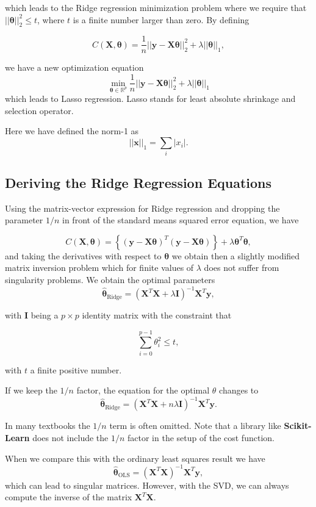 \documentclass[%
oneside,                 %
final,                   %
10pt]{article}
\begin{document}
which leads to the Ridge regression minimization problem where we
require that $\vert\vert \bm{\theta}\vert\vert_2^2\le t$, where $t$ is
a finite number larger than zero. By defining

\[
C(\bm{X},\bm{\theta})=\frac{1}{n}\vert\vert \bm{y}-\bm{X}\bm{\theta}\vert\vert_2^2+\lambda\vert\vert \bm{\theta}\vert\vert_1,
\]

we have a new optimization equation
\[
{\displaystyle \min_{\bm{\theta}\in
{\mathbb{R}}^{p}}}\frac{1}{n}\vert\vert \bm{y}-\bm{X}\bm{\theta}\vert\vert_2^2+\lambda\vert\vert \bm{\theta}\vert\vert_1
\]
which leads to Lasso regression. Lasso stands for least absolute shrinkage and selection operator. 

Here we have defined the norm-1 as 
\[
\vert\vert \bm{x}\vert\vert_1 = \sum_i \vert x_i\vert. 
\]

\subsection{Deriving the  Ridge Regression Equations}

Using the matrix-vector expression for Ridge regression and dropping the parameter $1/n$ in front of the standard means squared error equation, we have

\[
C(\bm{X},\bm{\theta})=\left\{(\bm{y}-\bm{X}\bm{\theta})^T(\bm{y}-\bm{X}\bm{\theta})\right\}+\lambda\bm{\theta}^T\bm{\theta},
\]
and 
taking the derivatives with respect to $\bm{\theta}$ we obtain then
a slightly modified matrix inversion problem which for finite values
of $\lambda$ does not suffer from singularity problems. We obtain
the optimal parameters
\[
\hat{\bm{\theta}}_{\mathrm{Ridge}} = \left(\bm{X}^T\bm{X}+\lambda\bm{I}\right)^{-1}\bm{X}^T\bm{y},
\]

with $\bm{I}$ being a $p\times p$ identity matrix with the constraint that

\[
\sum_{i=0}^{p-1} \theta_i^2 \leq t,
\]

with $t$ a finite positive number. 

If we keep the $1/n$ factor, the equation for the optimal $\theta$ changes to
\[
\hat{\bm{\theta}}_{\mathrm{Ridge}} = \left(\bm{X}^T\bm{X}+n\lambda\bm{I}\right)^{-1}\bm{X}^T\bm{y}.
\]

In many textbooks the $1/n$ term is often omitted. Note that a library like \textbf{Scikit-Learn} does not include the $1/n$ factor in the setup of the cost function.

When we compare this with the ordinary least squares result we have
\[
\hat{\bm{\theta}}_{\mathrm{OLS}} = \left(\bm{X}^T\bm{X}\right)^{-1}\bm{X}^T\bm{y},
\]
which can lead to singular matrices. However, with the SVD, we can always compute the inverse of the matrix $\bm{X}^T\bm{X}$.
\end{document}
